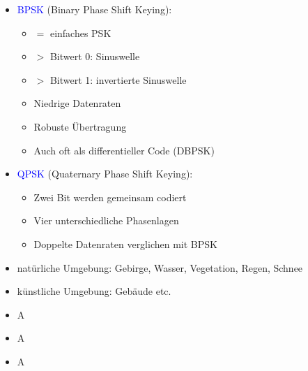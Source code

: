\begin{itemize}
    \item \textcolor{blue}{BPSK} (Binary Phase Shift Keying):
    \begin{itemize}
        \item $=$ einfaches PSK
        \item $>$ Bitwert 0: Sinuswelle
        \item $>$ Bitwert 1: invertierte Sinuswelle
        \item Niedrige Datenraten
        \item Robuste Übertragung
        \item Auch oft als differentieller Code (DBPSK)
    \end{itemize}
    \item \textcolor{blue}{QPSK} (Quaternary Phase Shift Keying):
    \begin{itemize}
        \item Zwei Bit werden gemeinsam codiert
        \item Vier unterschiedliche Phasenlagen
        \item Doppelte Datenraten verglichen mit BPSK
    \end{itemize}
\end{itemize}

\begin{itemize}
    \item natürliche Umgebung: Gebirge, Wasser, Vegetation, Regen, Schnee
    \item künstliche Umgebung: Gebäude etc.
\end{itemize}

\begin{itemize}
    \item \todo A
\end{itemize}

\begin{itemize}
    \item \todo A
\end{itemize}

\begin{itemize}
    \item \todo A
\end{itemize}

